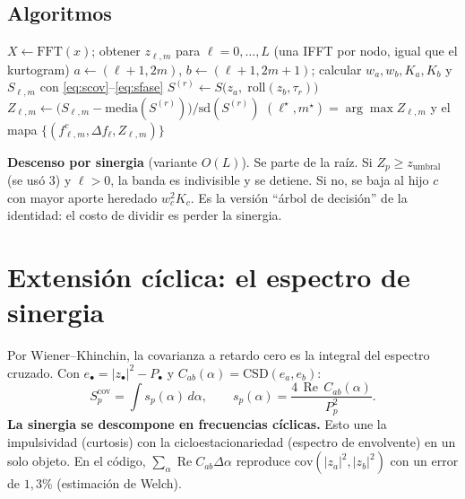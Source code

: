 \documentclass[11pt,a4paper]{article}
\theoremstyle{definition}
\theoremstyle{remark}
\renewcommand{\Re}{\operatorname{Re}}
\begin{document}
\subsection{Algoritmos}
\begin{algorithm}[h]
\caption{Sinergograma (métrica ciega)}
\begin{algorithmic}[1]
\State $X\gets\mathrm{FFT}(x)$; obtener $z_{\ell,m}$ para $\ell=0,\dots,L$ (una IFFT por nodo, igual que el kurtogram)
  \State $a\gets(\ell{+}1,2m)$, $b\gets(\ell{+}1,2m{+}1)$; calcular $w_a,w_b,K_a,K_b$ y $S_{\ell,m}$ con \eqref{eq:scov}--\eqref{eq:sfase}
   \State $S^{(r)}\gets S\big(z_a,\;\mathrm{roll}(z_b,\tau_r)\big)$ \EndFor
  \State $Z_{\ell,m}\gets\big(S_{\ell,m}-\mathrm{media}(S^{(r)})\big)/\mathrm{sd}(S^{(r)})$
\EndFor
\State \Return $(\ell^\star,m^\star)=\arg\max Z_{\ell,m}$ y el mapa $\{(f^c_{\ell,m},\Delta f_\ell,Z_{\ell,m})\}$
\end{algorithmic}
\end{algorithm}

\noindent\textbf{Descenso por sinergia} (variante $O(L)$). Se parte de la raíz. Si $Z_p\ge z_{\text{umbral}}$ (se usó 3) y $\ell>0$, la banda es indivisible y se detiene. Si no, se baja al hijo $c$ con mayor aporte heredado $w_c^2K_c$. Es la versión ``árbol de decisión'' de la identidad: el costo de dividir es perder la sinergia.

\section{Extensión cíclica: el espectro de sinergia}\label{sec:ciclica}
Por Wiener--Khinchin, la covarianza a retardo cero es la integral del espectro cruzado. Con $e_\bullet=|z_\bullet|^2-P_\bullet$ y $C_{ab}(\alpha)=\mathrm{CSD}(e_a,e_b)$:
\begin{equation}\label{eq:sespectro}
S^{\mathrm{cov}}_p=\int s_p(\alpha)\,d\alpha,\qquad s_p(\alpha)=\frac{4\,\Re\,C_{ab}(\alpha)}{P_p^2}.
\end{equation}
\textbf{La sinergia se descompone en frecuencias cíclicas.} Esto une la impulsividad (curtosis) con la cicloestacionariedad (espectro de envolvente) en un solo objeto. En el código, $\sum_\alpha\Re C_{ab}\Delta\alpha$ reproduce $\mathrm{cov}(|z_a|^2,|z_b|^2)$ con un error de $1{,}3\%$ (estimación de Welch).
\end{document}
